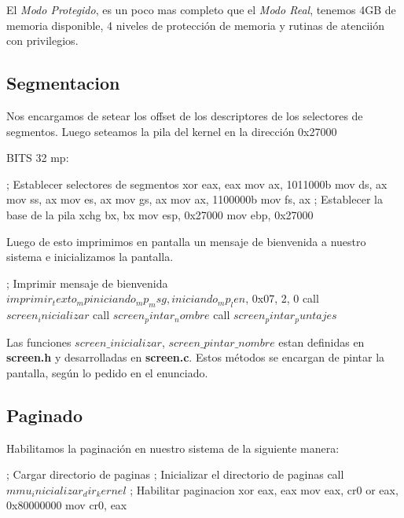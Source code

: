 El \textit{Modo Protegido}, es un poco mas completo que el \textit{Modo Real}, tenemos 4GB de memoria disponible, 4 niveles de protecci\'on de memoria y rutinas de atencii\'on con privilegios.

\subsection{Segmentacion}
Nos encargamos de setear los offset de los descriptores de los selectores de segmentos. Luego seteamos la pila del kernel en la direcci\'on 0x27000

\begin{algorithmic}
\State \tab BITS 32
\State \tab mp:

    \State \tab \tab ; Establecer selectores de segmentos
    \State \tab \tab xor eax, eax
    \State \tab \tab  mov ax, 1011000b
    \State \tab \tab  mov ds, ax
    \State \tab \tab  mov ss, ax
    \State \tab \tab  mov es, ax
    \State \tab \tab  mov gs, ax
    \State \tab \tab  mov ax, 1100000b
    \State \tab \tab  mov fs, ax
    \State \tab \tab  ; Establecer la base de la pila
    \State \tab \tab  xchg bx, bx
    \State \tab \tab  mov esp, 0x27000
    \State \tab \tab  mov ebp, 0x27000
\end{algorithmic}

Luego de esto imprimimos en pantalla un mensaje de bienvenida a nuestro sistema e inicializamos la pantalla.
\begin{algorithmic}
    \State \tab \tab ; Imprimir mensaje de bienvenida
    \State \tab \tab $imprimir_texto_mp iniciando_mp_msg, iniciando_mp_len$, 0x07, 2, 0
    \State \tab \tab call $screen_inicializar$
    \State \tab \tab call $screen_pintar_nombre$
    \State \tab \tab call $screen_pintar_puntajes$
\end{algorithmic}

Las funciones \textit{$screen\_inicializar$}, \textit{$screen\_pintar\_nombre$} estan definidas en \textbf{screen.h} y desarrolladas en \textbf{screen.c}. Estos m\'etodos se encargan de pintar la pantalla, seg\'un lo pedido en el enunciado.

\subsection{Paginado}
Habilitamos la paginaci\'on en nuestro sistema de la siguiente manera:
\begin{algorithmic}
    \State \tab ; Cargar directorio de paginas
    \State \tab ; Inicializar el directorio de paginas
    \State \tab call $mmu_inicializar_dir_kernel$
    \State \tab ; Habilitar paginacion
    \State \tab xor eax, eax
    \State \tab mov eax, cr0
    \State \tab or eax, 0x80000000
    \State \tab mov cr0, eax
\end{algorithmic}

